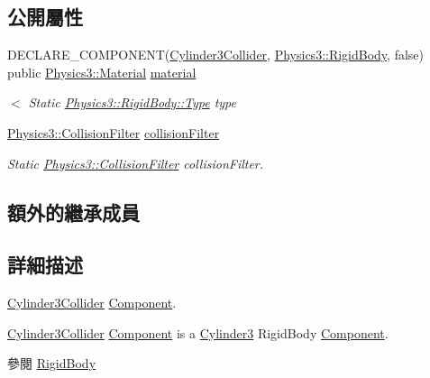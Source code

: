 \subsection*{公開屬性}
\begin{DoxyCompactItemize}
\item 
D\+E\+C\+L\+A\+R\+E\+\_\+\+C\+O\+M\+P\+O\+N\+E\+NT(\hyperlink{class_magnum_1_1_cylinder3_collider}{Cylinder3\+Collider}, \hyperlink{class_magnum_1_1_physics3_1_1_rigid_body}{Physics3\+::\+Rigid\+Body}, false) public \hyperlink{class_magnum_1_1_physics3_1_1_material}{Physics3\+::\+Material} \hyperlink{class_magnum_1_1_cylinder3_collider_a9ae56c2146bdab47ca13a408e62509e0}{material}
\begin{DoxyCompactList}\small\item\em $<$ Static \hyperlink{class_magnum_1_1_physics3_1_1_rigid_body_a429aa4fb7256b083334c86cdcd0d6b31}{Physics3\+::\+Rigid\+Body\+::\+Type} type \end{DoxyCompactList}\item 
\hyperlink{class_magnum_1_1_physics3_1_1_collision_filter}{Physics3\+::\+Collision\+Filter} \hyperlink{class_magnum_1_1_cylinder3_collider_a51bfaa4715c3cd929039a81fb1406d57}{collision\+Filter}\hypertarget{class_magnum_1_1_cylinder3_collider_a51bfaa4715c3cd929039a81fb1406d57}{}\label{class_magnum_1_1_cylinder3_collider_a51bfaa4715c3cd929039a81fb1406d57}

\begin{DoxyCompactList}\small\item\em Static \hyperlink{class_magnum_1_1_physics3_1_1_collision_filter}{Physics3\+::\+Collision\+Filter} collision\+Filter. \end{DoxyCompactList}\end{DoxyCompactItemize}
\subsection*{額外的繼承成員}


\subsection{詳細描述}
\hyperlink{class_magnum_1_1_cylinder3_collider}{Cylinder3\+Collider} \hyperlink{class_magnum_1_1_component}{Component}. 

\hyperlink{class_magnum_1_1_cylinder3_collider}{Cylinder3\+Collider} \hyperlink{class_magnum_1_1_component}{Component} is a \hyperlink{class_magnum_1_1_cylinder3}{Cylinder3} Rigid\+Body \hyperlink{class_magnum_1_1_component}{Component}. \begin{DoxySeeAlso}{參閱}
\hyperlink{class_magnum_1_1_physics3_1_1_rigid_body_a2327744d90c049296ea0d63b3e64d335}{Rigid\+Body} 
\end{DoxySeeAlso}


